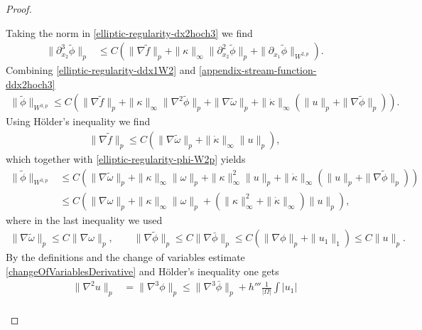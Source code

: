 \documentclass{article}
\theoremstyle{definition}
\theoremstyle{definition}
\begin{document}
\begin{proof}
\begin{itemize}
    Taking the norm in \eqref{elliptic-regularity-dx2hoch3} we find
    \begin{equation}
        \label{appendix-stream-function-ddx2hoch3}
        \begin{aligned}
            \|\partial_{x_2}^3\tilde \phi\|_{p}&\leq C \left( \|\nabla \tilde f\|_p + \|\kappa\|_\infty \|\partial_{x_2}^2\tilde\phi\|_p + \|\partial_{x_1}\tilde \phi\|_{W^{2,p}} \right).
        \end{aligned}
    \end{equation}
    Combining \eqref{elliptic-regularity-ddx1W2} and \eqref{appendix-stream-function-ddx2hoch3}
    \begin{align*}
        \|\tilde\phi\|_{W^{3,p}}\leq C \left(\|\nabla \tilde f\|_p + \|\kappa\|_\infty \|\nabla^2\tilde\phi\|_p +\|\nabla \tilde\omega\|_p + \|\dot\kappa\|_\infty (\|u\|_p + \|\nabla \tilde\phi\|_p)  \right).
    \end{align*}
    Using Hölder's inequality we find
    \begin{align*}
        \|\nabla \tilde f\|_p \leq C(\|\nabla \tilde \omega\|_p + \|\dot\kappa\|_\infty \|u\|_p),
    \end{align*}
    which together with \eqref{elliptic-regularity-phi-W2p} yields
    \begin{equation}
        \label{elliptic-regularity-phi-W3p}
        \begin{aligned}
            \|\tilde\phi\|_{W^{3,p}}&\leq C \left(\|\nabla \tilde\omega\|_p + \|\kappa\|_\infty \|\omega\|_p+ \|\kappa\|_\infty^2 \|u\|_p + \|\dot\kappa\|_\infty (\|u\|_p + \|\nabla \tilde\phi\|_p) \right)
            \\
            &\leq  C \left(\|\nabla \omega\|_p + \|\kappa\|_\infty \|\omega\|_p+ (\|\kappa\|_\infty^2 + \|\dot\kappa\|_\infty) \|u\|_p \right),
        \end{aligned}
    \end{equation}
    where in the last inequality we used
    \begin{align}
        \label{elliptic-regularity-gradphi}
        \|\nabla\tilde\omega\|_p\leq C \|\nabla\omega\|_p, \qquad \|\nabla\tilde\phi\|_p\leq C\|\nabla\bar\phi\|_p \leq C (\|\nabla\phi\|_p+\|u_1\|_1)\leq C\|u\|_p.
    \end{align}
    By the definitions and the change of variables estimate \eqref{changeOfVariablesDerivative} and Hölder's inequality one gets
    \begin{align*}
        \|\nabla^2 u\|_p &= \|\nabla^3 \phi\|_p\leq \|\nabla^3\bar \phi\|_p + h'''\frac{1}{|\Omega|}\int |u_1| \\

\end{align*}
\end{itemize}
\end{proof}
\end{document}
